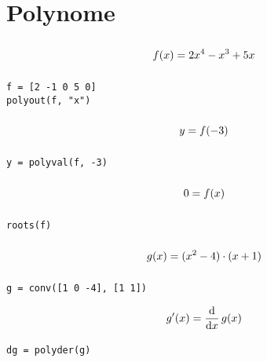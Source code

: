 \documentclass
[
  fontsize = 11pt,
  parskip  = half-,
  BCOR     = 0pt,
  DIV      = 11,
  ngerman
]
{scrartcl}
\begin{document}
\section{Polynome}
\begin{minipage}{\mw}
  \begin{equation*}
    \vphantom{\bigg(}%
    f(x)=2x^4-x^3+5x
  \end{equation*}
\end{minipage}%
\hfill
\begin{minipage}{\cw}
\begin{verbatim}
f = [2 -1 0 5 0]
polyout(f, "x")
\end{verbatim}
\end{minipage}

\begin{minipage}{\mw}
  \begin{equation*}
    \vphantom{\bigg(}%
    y=f(-3)
  \end{equation*}
\end{minipage}%
\hfill
\begin{minipage}{\cw}
\begin{verbatim}
y = polyval(f, -3)
\end{verbatim}
\end{minipage}
\begin{minipage}{\mw}
  \begin{equation*}
    \vphantom{\bigg(}%
    0=f(x)
  \end{equation*}
\end{minipage}%
\hfill
\begin{minipage}{\cw}
\begin{verbatim}
roots(f)
\end{verbatim}
\end{minipage}
\begin{minipage}{\mw}
  \begin{equation*}
    \vphantom{\bigg(}%
    g(x)=(x^2-4)\cdot(x+1)
  \end{equation*}
\end{minipage}%
\hfill
\begin{minipage}{\cw}
\begin{verbatim}
g = conv([1 0 -4], [1 1])
\end{verbatim}
\end{minipage}

\begin{minipage}{\mw}
  \begin{equation*}
    \vphantom{\bigg(}%
    g'(x)=\frac{\mathrm{d}}{\mathrm{d}x}\,g(x)
  \end{equation*}
\end{minipage}%
\hfill
\begin{minipage}{\cw}
\begin{verbatim}
dg = polyder(g)
\end{verbatim}
\end{minipage}
\end{document}
